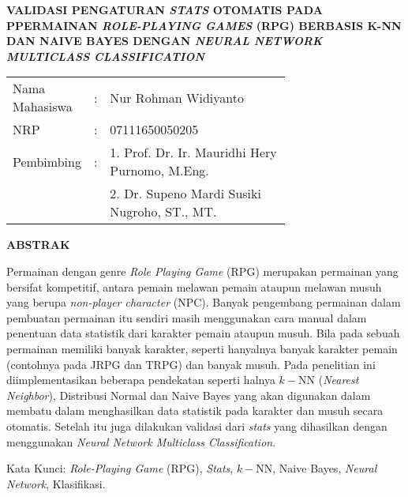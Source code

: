 \begin{spacing}{1}
	\begin{center}
		\large\textbf{VALIDASI PENGATURAN \textit{STATS} OTOMATIS PADA PPERMAINAN \textit{ROLE-PLAYING GAMES} (RPG) BERBASIS K-NN DAN NAIVE BAYES DENGAN \textit{NEURAL NETWORK MULTICLASS CLASSIFICATION}}
	\end{center}
	\vspace{2ex}
	
	\begin{adjustwidth}{-0.2cm}{}
		\begin{tabular}{lcp{0.7\linewidth}}
			Nama Mahasiswa &:& Nur Rohman Widiyanto \\
			NRP &:&	07111650050205 \\
			Pembimbing &:& 1. Prof. Dr. Ir. Mauridhi Hery Purnomo, M.Eng. \\
			& & 2. Dr. Supeno Mardi Susiki Nugroho, ST., MT. \\
		\end{tabular}
	\end{adjustwidth}
	\vspace{2ex}
	
	\begin{center}
		\large\textbf{ABSTRAK}
	\end{center}
	\vspace{1ex}
	
	Permainan dengan genre \textit{Role Playing Game} (RPG) merupakan permainan yang bersifat kompetitif, antara pemain melawan pemain ataupun melawan musuh yang berupa \textit{non-player character} (NPC). Banyak pengembang permainan dalam pembuatan permainan itu sendiri masih menggunakan cara manual dalam penentuan data statistik dari karakter pemain ataupun musuh. Bila pada sebuah permainan memiliki banyak karakter, seperti hanyalnya banyak karakter pemain (contohnya pada JRPG dan TRPG) dan banyak musuh. Pada penelitian ini diimplementasikan beberapa pendekatan seperti halnya $k-$NN (\textit{Nearest Neighbor}), Distribusi Normal dan Naive Bayes yang akan digunakan dalam membatu dalam menghasilkan data statistik pada karakter dan musuh secara otomatis. Setelah itu juga dilakukan validasi dari \textit{stats} yang dihasilkan dengan menggunakan \textit{Neural Network Multiclass Classification}.
	\vspace{2ex}
	

	Kata Kunci: \textit{Role-Playing Game} (RPG), \textit{Stats}, $k-$NN, Naive Bayes, \textit{Neural Network}, Klasifikasi.
\end{spacing}